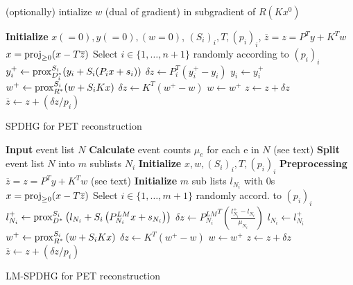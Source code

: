(optionally) intialize $w$ (dual of gradient) in subgradient of $R(Kx^0)$

\begin{algorithm}[t]
\begin{algorithmic}[1]
\small
\State \textbf{Initialize} $x(=0),y(=0),(w=0)$, $(S_i)_i,T,(p_i)_i$,
\State $\overline{z} = z = P^T y + K^T w$
\Repeat
	\State $x = \operatorname{proj}_{\geq 0} (x - T \overline{z})$
	\State Select $i \in \{ 1,\ldots,n+1\} $ randomly according to $(p_i)_i$
	\State $y_i^+ \gets \operatorname{prox}_{D_i^*}^{S_i} ( y_i + S_i  ( P_i x + s_i))$
	\State $\delta z \gets P_i^T (y_i^+ - y_i)$
	\State $y_i \gets y_i^+$
  \Else
	\State $w^+ \gets \operatorname{prox}_{R^*}^{S_i} ( w + S_i  K x)$
	\State $\delta z \gets K^T (w^+ - w)$
	\State $w \gets w^+$
  \EndIf
	\State $z \gets z + \delta z$
	\State $\overline{z} \gets  z + (\delta z/p_i)$
\State {}
\end{algorithmic}
\caption{SPDHG for PET reconstruction}
\label{alg:spdhg}
\end{algorithm}




\begin{algorithm}[t]
\begin{algorithmic}[1]
\small
\State \textbf{Input} event list $N$
\State \textbf{Calculate} event counts $\mu_e$ for each e in $N$ (see text)
\State \textbf{Split} event list $N$ into $m$ sublists $N_i$
\State \textbf{Initialize} $x,w,(S_i)_i,T,(p_i)_i$
\State \textbf{Preprocessing} $\overline{z} = z = P^T y + K^T w$ (see text)
\State \textbf{Initialize} $m$ sub lists $l_{N_i}$ with 0s
\Repeat
	\State $x = \operatorname{proj}_{\geq 0} (x - T \overline{z})$
	\State Select $i \in \{1,\ldots,m+1\}$ randomly accord. to $(p_i)_i$
	  \State $l_{N_i}^+ \gets \operatorname{prox}_{D^*}^{S_i} \left( l_{N_i} + S_i \left(P^{LM}_{N_i} x + s_{N_i} \right) \right)$
	  \State $\delta z \gets {P^{LM}_{N_i}}^T \left(\frac{l_{N_i}^+ - l_{N_i}}{\mu_{N_i}}\right)$
	  \State $l_{N_i} \gets l_{N_i}^+$
  \Else
	  \State $w^+ \gets \operatorname{prox}_{R^*}^{S_i} \left( w + S_i K x \right)$
	  \State $\delta z \gets K^T \left(w^+ - w\right)$
	  \State $w \gets w^+$
  \EndIf
	\State $z \gets z + \delta z$
	\State $\overline{z} \gets  z + (\delta z/p_i)$
\State {}
\end{algorithmic}
\caption{LM-SPDHG for PET reconstruction}
\label{alg:lmspdhg}
\end{algorithm}




